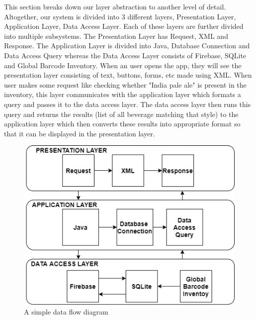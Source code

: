 This section breaks down our layer abstraction to another level of detail. Altogether, our system is divided into 3 different layers, Presentation Layer, Application Layer, Data Access Layer. Each of these layers are further divided into multiple subsystems. The Presentation Layer has Request, XML and Response. The Application Layer is divided into Java, Database Connection and Data Access Query whereas the Data Access Layer consists of Firebase, SQLite and Global Barcode Inventory. When an user opens the app, they will see the presentation layer consisting of text, buttons, forms, etc made using XML. When user makes some request like checking whether "India pale ale" is present in the inventory, this layer communicates with the application layer which formats a query and passes it to the data access layer. The data access layer then runs this query and returns the results (list of all beverage matching that style) to the application layer which then converts these results into appropriate format so that it can be displayed in the presentation layer. 

\begin{figure}[h!]
	\centering
 	\includegraphics[width=\textwidth]{images/Full.png}
 \caption{A simple data flow diagram}
\end{figure}
